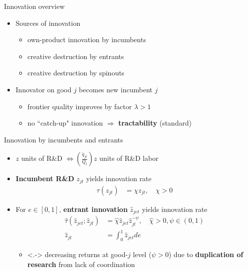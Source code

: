 \documentclass[english,usenames,dvipsnames,handout]{beamer}
\begin{document}
\begin{frame}{Innovation overview}
	\begin{itemize}
		\item<+-> Sources of innovation
		\begin{itemize}
			\item own-product innovation by incumbents
			\item creative destruction by entrants 
			\item creative destruction by spinouts
		\end{itemize}
		\medskip
		\item<+-> Innovator on good $j$ becomes new incumbent $j$
		\begin{itemize}
			\item<+-> frontier quality improves by factor $\lambda > 1$
			\item<+-> no ``catch-up" innovation $\Rightarrow$ \alert{\textbf{tractability}} (standard)
		\end{itemize}
	\end{itemize}
\end{frame}

\begin{frame}{Innovation by incumbents and entrants}
	\begin{itemize}
		\item<+-> $z$ units of R\&D $\Leftrightarrow (\frac{\bar{q}_{jt}}{Q_t})z$ units of R\&D labor
		\bigskip
		\item<+-> \alert{\textbf{Incumbent R\&D}} $z_{jt}$ yields innovation rate 
		\begin{align*}
		\tau(z_{jt}) &= \chi z_{jt}, \quad \chi > 0
		\end{align*}
		\item<+-> For $e \in [0,1]$, \alert{\textbf{entrant innovation}} $\hat{z}_{jet}$ yields innovation rate
		\begin{align*}
		\hat{\tau}(\hat{z}_{jet};\hat{z}_{jt}) &= \hat{\chi} \hat{z}_{jet} \hat{z}_{jt}^{-\psi}, \quad \hat{\chi} > 0, \psi \in (0,1) \\
		\hat{z}_{jt} &= \int_0^1 \hat{z}_{jet} de
		\end{align*}
		\begin{itemize}
			\item<.-> decreasing returns at good-$j$ level ($\psi > 0$) due to \textbf{\alert{duplication of research}} from lack of coordination
		\end{itemize}
	\end{itemize}
\end{frame}
\end{document}
